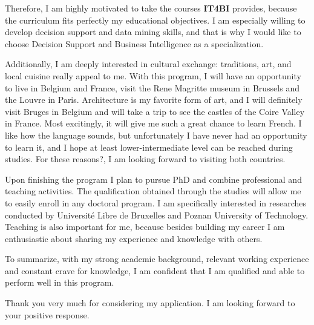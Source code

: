 \documentclass[a4paper,14pt]{extarticle}
\begin{document}
Therefore, I am highly motivated to take the courses \textbf{IT4BI} provides, because the curriculum fits perfectly my educational objectives. I am especially willing to develop decision support and data mining skills, and that is why I would like to choose Decision Support and Business Intelligence as a specialization.

Additionally, I am deeply interested in cultural exchange: traditions, art, and local cuisine really appeal to me. With this program, I will have an opportunity to live in Belgium and France, visit the Rene Magritte museum in Brussels and the Louvre in Paris. Architecture is my favorite form of art, and I will definitely visit Bruges in Belgium and will take a trip to see the castles of the Coire Valley in France. Most excitingly, it will give me such a great chance to learn French. I like how the language sounds, but unfortunately I have never had an opportunity to learn it, and I hope at least lower-intermediate level can be reached during studies. For these reasons?, I am looking forward to visiting both countries.

Upon finishing the program I plan to pursue PhD and combine professional and teaching activities. The qualification obtained through the studies will allow me to easily enroll in any doctoral program. I am specifically interested in researches conducted by Université Libre de Bruxelles and Poznan University of Technology. Teaching is also important for me, because besides building my career I am enthusiastic about sharing my experience and knowledge with others.

To summarize, with my strong academic background, relevant working experience and constant crave for knowledge, I am confident that I am qualified and able to perform well in this program.

Thank you very much for considering my application. I am looking forward to your positive response.
\end{document}
